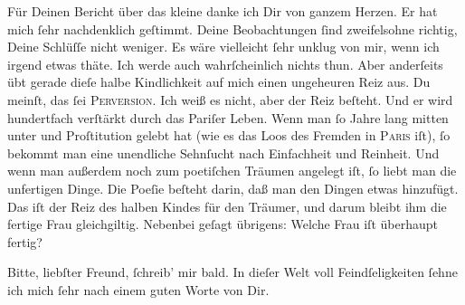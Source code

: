 \pstart
           Für Deinen Bericht über das kleine \label{K_L02833-6v}\label{K_L02833-6} danke ich Dir von ganzem Herzen. Er hat mich{ }ſehr nachdenklich geſtimmt.
               Deine Beobachtungen {\pb}ſind zweifelsohne richtig,
               Deine  Schlüſſe nicht weniger. Es wäre vielleicht{ }ſehr unklug von mir, wenn ich
               irgend etwas thäte. Ich werde auch wahrſcheinlich nichts thun. Aber anderſeits übt
               gerade dieſe halbe Kindlichkeit auf mich  einen ungeheuren Reiz aus. Du meinſt, das{ }ſei \textsc{Perversion}. Ich weiß es nicht, aber der Reiz beſteht. Und er wird
               hundertfach verſtärkt durch das Pariſer Leben.
               Wenn man{ }ſo Jahre lang mitten unter \label{K_L02833-7v}\label{K_L02833-7} und Proſtitution gelebt hat (wie es das Loos des Fremden in \textsc{Paris} iſt),{ }ſo bekommt man eine unendliche Sehnſucht nach {\pb}Einfachheit und Reinheit. Und wenn man außerdem noch
               zum poetiſchen Träumen  angelegt iſt,{ }ſo liebt man
               die unfertigen Dinge. Die Poeſie beſteht darin, daß man den Dingen etwas hinzufügt.
               Das iſt der Reiz des halben Kindes für den Träumer, und darum bleibt \strikeout{\textcolor{gray}{×}\-\textcolor{gray}{×}} ihm die fertige Frau gleichgiltig. Nebenbei geſagt übrigens: Welche Frau iſt
               überhaupt fertig?\pend
           
\pstart
           Bitte, liebſter Freund,{ }ſchreib’ mir bald. In dieſer {\pb}Welt voll Feindſeligkeiten{ }ſehne ich mich{ }ſehr nach einem guten Worte von Dir.\pend
           

